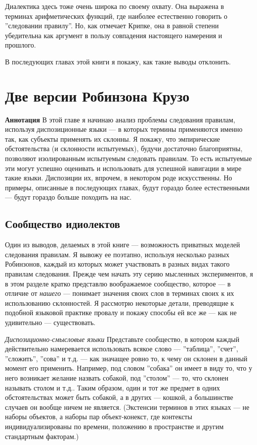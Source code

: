 \documentclass[11pt]{book}
\begin{document}
Диалектика здесь тоже очень широка по своему охвату. Она выражена в терминах арифметических функций, где наиболее естественно говорить о ''следовании правилу''. Но, как отмечает Крипке, она в равной степени убедительна как аргумент в пользу совпадения настоящего намерения и прошлого.

В последующих главах этой книги я покажу, как такие выводы отклонить.

\chapter{Две версии Робинзона Крузо}

\qquad

\textbf{Аннотация} \quad В этой главе я начинаю анализ проблемы следования правилам, используя диспозиционные языки --- в которых термины применяются именно так, как субъекты применять их склонны. Я покажу, что эмпирические обстоятельства (и склонности испытуемых), будучи достаточно благоприятны, позволяют изолированным испытуемым следовать правилам. То есть испытуемые эти могут успешно оценивать и использовать для успешной навигации в мире такие языки. Диспозиции их, впрочем, в некотором роде искусственны. Но примеры, описанные в последующих главах, будут гораздо более естественными --- будут гораздо больше походить на нас.

\qquad

\section{Сообщество идиолектов}

Один из выводов, делаемых в этой книге --- возможность приватных моделей следования правилам. Я вывожу ее поэтапно, используя несколько разных Робинзонов, каждый из которых может участвовать в разных видах такого правилам следования. Прежде чем начать эту серию мысленных экспериментов, я в этом разделе кратко представлю воображаемое сообщество, которое --- в отличие от \textit{нашего} --- понимает значения своих слов в терминах своих к их использованию склонностей. Я рассмотрю некоторые детали, преводящие к подобной языковой практике провалу и покажу способы ей все же --- как не удивительно --- существовать.

\textit{Диспозиционно-смысловые языки} \quad Представьте сообщество, в котором каждый действительно намеревается использовать всякое слово --- ''таблица'', ''счет'', ''сложить'', ''сова'' и т.д. --- как значащее ровно то, к чему он склонен в данный момент его применить. Например, под словом ''собака'' он имеет в виду то, что у него возникает желание назвать собакой, под ''столом'' --- то, что склонен называть столом и т.д.. Таким образом, один и тот же предмет в одних обстоятельствах может быть собакой, а в других --- кошкой, а большинстве случаев он вообще ничем не является. (Экстенсии терминов в этих языках --- не наборы объектов, а наборы пар объект-конекст, где контексты индивидуализированы по времени, положению в пространстве и другим стандартным факторам.)
\end{document}
